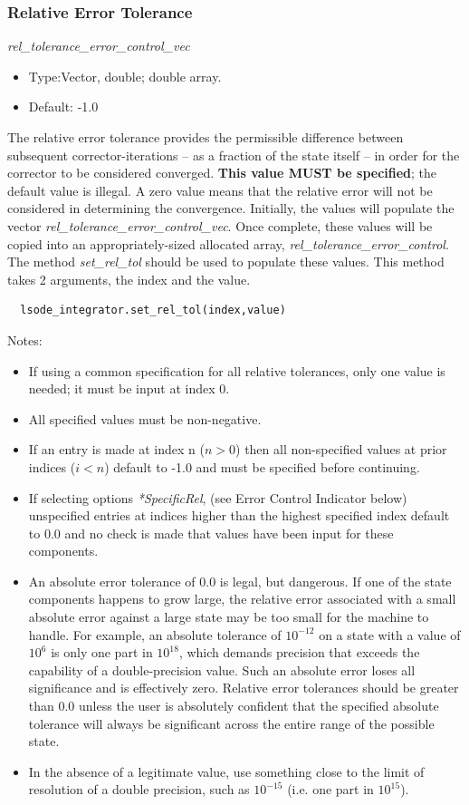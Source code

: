 \subsubsection{Relative Error Tolerance}
\textit{rel\_tolerance\_error\_control\_vec}

\begin{itemize}
\item
Type:Vector, double; double array.
\item
Default: -1.0
\end{itemize}
The relative error tolerance provides the permissible difference between
subsequent corrector-iterations – as a fraction of the state itself –
in order for the corrector to be considered converged.  \textbf{This value MUST
be specified}; the default value is illegal.  A zero value means that the
relative error will not be considered in determining the convergence.
Initially, the values will populate the vector 
\textit{rel\_tolerance\_error\_control\_vec}.
 Once complete, these values will be copied into an appropriately-sized
allocated array, \textit{rel\_tolerance\_error\_control}.
The method \textit{set\_rel\_tol} should be used to populate these values.
This method takes 2 arguments, the index and the value.
\begin{verbatim}
  lsode_integrator.set_rel_tol(index,value)
\end{verbatim}
Notes:
\begin{itemize}
\item
If using a common specification for all relative tolerances, only one
value is needed; it must be input at index 0.
\item
All specified values must be non-negative.
\item
If an entry is made at index n ($n>0$) then all non-specified values at prior
indices ($i<n$) default to -1.0 and must be specified before continuing.
\item
If selecting options \textit{*SpecificRel}, (see Error Control Indicator
below) unspecified entries at indices higher
than the highest specified index default to 0.0 and no check is made that
values have been input for these components.
\item
An absolute error tolerance of 0.0 is legal, but dangerous.  If one of
the state components happens to grow large, the relative error associated
with a small absolute error against a large state may be too small for
the machine to handle.  For example, an absolute tolerance of $10^{-12}$ on
a state with a value of $10^6$ is only one part in $10^{18}$, which demands
precision
that exceeds the capability of a double-precision value.  Such an absolute
error loses all significance and is effectively zero.  Relative error
tolerances should be greater than 0.0 unless the user is absolutely confident
that the specified absolute tolerance will always be significant across
the entire range of the possible state.
\item
In the absence of a legitimate value, use something close to the limit of
resolution of a double precision, such as
$10^{-15}$ (i.e. one part in $10^{15}$).
\end{itemize}


